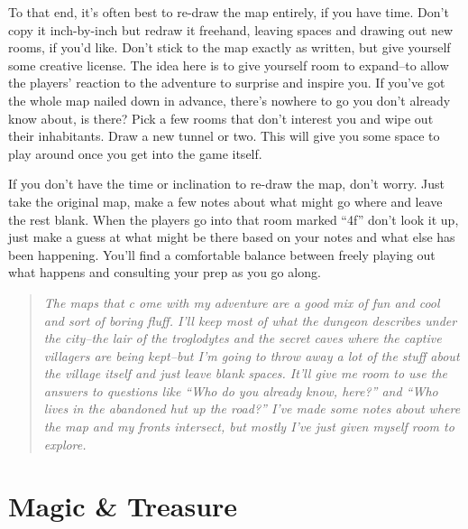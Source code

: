 To that end, it's often best to re-draw the map entirely, if you have time. Don't copy it inch-by-inch but redraw it freehand, leaving spaces and drawing out new rooms, if you'd like. Don't stick to the map exactly as written, but give yourself some creative license. The idea here is to give yourself room to expand--to allow the players' reaction to the adventure to surprise and inspire you. If you've got the whole map nailed down in advance, there's nowhere to go you don't already know about, is there? Pick a few rooms that don't interest you and wipe out their inhabitants. Draw a new tunnel or two. This will give you some space to play around once you get into the game itself.


If you don't have the time or inclination to re-draw the map, don't worry. Just take the original map, make a few notes about what might go where and leave the rest blank. When the players go into that room marked ``4f'' don't look it up, just make a guess at what might be there based on your notes and what else has been happening. You'll find a comfortable balance between freely playing out what happens and consulting your prep as you go along.

\begin{quote}
\emph{The maps that c ome with my adventure are a good mix of fun and cool and sort of boring fluff. I'll keep most of what the dungeon describes under the city--the lair of the troglodytes and the secret caves where the captive villagers are being kept--but I'm going to throw away a lot of the stuff about the village itself and just leave blank spaces. It'll give me room to use the answers to questions like ``Who do you already know, here?'' and ``Who lives in the abandoned hut up the road?'' I've made some notes about where the map and my fronts intersect, but mostly I've just given myself room to explore.}
\end{quote}
\section*{Magic \& Treasure}


